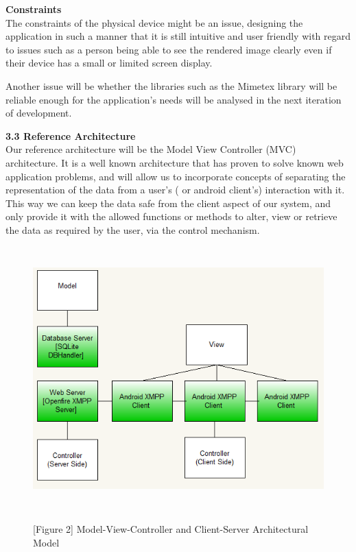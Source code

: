 \documentclass[29pt,a4paper]{moderncv}
\begin{document}
			
			\noindent\textbf{Constraints}
				\\The constraints of the physical device might be an issue, designing the application in such a manner that it is still intuitive and user friendly with regard to issues such as a person being able to see the rendered image clearly even if their device has a small or limited screen display.
				
				Another issue will be whether the libraries such as the Mimetex library will be reliable enough for the application’s needs will be analysed in the next iteration of development.
		\vspace{5mm}
		
		\noindent \textbf{3.3 Reference Architecture}
			\\Our reference architecture will be the Model View Controller (MVC) architecture. It is a well known architecture that has proven to solve known web application problems, and will allow us to incorporate concepts of separating the representation of the data from a user’s ( or android client’s) interaction with it.  This way we can keep the data safe from the client aspect of our system, and only provide it with the allowed functions or methods to alter, view or retrieve the data as required by the user, via the control mechanism.\\
			
			\noindent\begin{figure}
							\centering
							\includegraphics[width=5.5in, height=4.0in]{./OverallArchitecture.png}
							\\\caption{[Figure 2] Model-View-Controller and Client-Server Architectural Model}
							\end{figure}
			
\end{document}
